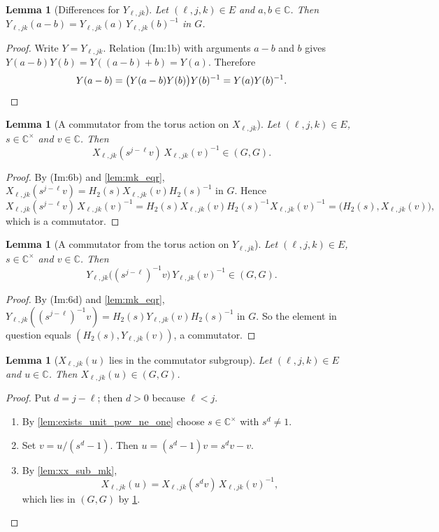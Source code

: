 \documentclass[11pt]{article}
\newtheorem{lemma}[theorem]{Lemma}
\theoremstyle{definition}
\theoremstyle{remark}
\newcommand{\C}{\mathbb{C}}
\newcommand{\Cx}{\mathbb{C}^{\times}}
\newcommand{\comm}{(G,G)}
\begin{document}
\begin{lemma}[Differences for $Y_{\ell,jk}$]\label{lem:yy_sub_mk}
Let $(\ell,j,k)\in E$ and $a,b\in\C$. Then $Y_{\ell,jk}(a-b)=Y_{\ell,jk}(a)\,Y_{\ell,jk}(b)^{-1}$ in $G$.
\end{lemma}
\begin{proof}
Write $Y=Y_{\ell,jk}$. Relation (Im:1b) with arguments $a-b$ and $b$ gives $Y(a-b)Y(b)=Y((a-b)+b)=Y(a)$. Therefore
\[
Y(a-b)=\big(Y(a-b)Y(b)\big)Y(b)^{-1}=Y(a)Y(b)^{-1}. \qedhere
\]
\end{proof}

\begin{lemma}[A commutator from the torus action on $X_{\ell,jk}$]\label{lem:xx_conj_mem}
Let $(\ell,j,k)\in E$, $s\in\Cx$ and $v\in\C$. Then
\[
X_{\ell,jk}(s^{j-\ell}v)\,X_{\ell,jk}(v)^{-1}\in\comm .
\]
\end{lemma}
\begin{proof}
By (Im:6b) and \cref{lem:mk_eqr}, $X_{\ell,jk}(s^{j-\ell}v)=H_2(s)X_{\ell,jk}(v)H_2(s)^{-1}$ in $G$. Hence
\[
X_{\ell,jk}(s^{j-\ell}v)\,X_{\ell,jk}(v)^{-1}=H_2(s)X_{\ell,jk}(v)H_2(s)^{-1}X_{\ell,jk}(v)^{-1}=\big(H_2(s),X_{\ell,jk}(v)\big),
\]
which is a commutator.
\end{proof}

\begin{lemma}[A commutator from the torus action on $Y_{\ell,jk}$]\label{lem:yy_conj_mem}
Let $(\ell,j,k)\in E$, $s\in\Cx$ and $v\in\C$. Then
\[
Y_{\ell,jk}\big((s^{j-\ell})^{-1}v\big)\,Y_{\ell,jk}(v)^{-1}\in\comm .
\]
\end{lemma}
\begin{proof}
By (Im:6d) and \cref{lem:mk_eqr}, $Y_{\ell,jk}((s^{j-\ell})^{-1}v)=H_2(s)Y_{\ell,jk}(v)H_2(s)^{-1}$ in $G$. So the element in question equals $(H_2(s),Y_{\ell,jk}(v))$, a commutator.
\end{proof}

\begin{lemma}[$X_{\ell,jk}(u)$ lies in the commutator subgroup]\label{lem:xx_mem}
Let $(\ell,j,k)\in E$ and $u\in\C$. Then $X_{\ell,jk}(u)\in\comm$.
\end{lemma}
\begin{proof}
Put $d=j-\ell$; then $d>0$ because $\ell<j$.
\begin{enumerate}
\item By \cref{lem:exists_unit_pow_ne_one} choose $s\in\Cx$ with $s^d\ne 1$.
\item Set $v=u/(s^d-1)$. Then $u=(s^d-1)v=s^dv-v$.
\item By \cref{lem:xx_sub_mk},
\[
X_{\ell,jk}(u)=X_{\ell,jk}(s^dv)\,X_{\ell,jk}(v)^{-1},
\]
which lies in $\comm$ by \cref{lem:xx_conj_mem}. \qedhere
\end{enumerate}
\end{proof}
\end{document}
